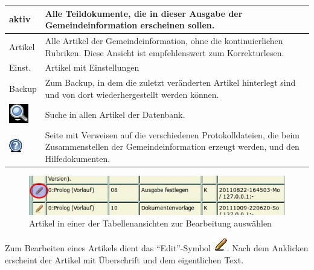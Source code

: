 \documentclass[12pt,a4paper,twoside]{article}%
\begin{document}
\begin{center}
\begin{tabular}{|l|p{13cm}|}
aktiv & Alle Teildokumente, die in dieser Ausgabe der Gemeindeinformation erscheinen sollen.   \\ \hline

Artikel & Alle Artikel der Gemeindeinformation, ohne die kontinuierlichen Rubriken. Diese Ansicht ist empfehlenswert zum Korrekturlesen.\\ \hline

Einst. & Artikel mit Einstellungen  \\ \hline
Backup& Zum Backup, in dem die zuletzt veränderten Artikel hinterlegt sind und von dort wiederhergestellt werden können. \\ \hline

\includegraphics[height=4ex]{icons/search.jpeg} & Suche in allen Artikel der Datenbank. \\ \hline\hline

\includegraphics[height=4ex]{icons/help.jpeg} & Seite mit Verweisen auf die verschiedenen Protokolldateien,
 die beim Zusammenstellen der Gemeindeinformation erzeugt werden, und den Hilfedokumenten. \\ \hline

\end{tabular} 
\end{center}


\begin{figure}[h]
\begin{center}                 
\includegraphics[width=0.6\linewidth]{webgui_artikelauswahl.jpeg}
\end{center}                 
\caption{Artikel in einer der Tabellenansichten zur Bearbeitung auswählen}
\end{figure} 


Zum Bearbeiten eines Artikels dient das "`Edit"'-Symbol \includegraphics[height=2ex]{icons/pencil.jpeg}.
Nach dem Anklicken erscheint der Artikel mit Überschrift und dem eigentlichen Text.
\end{document}
